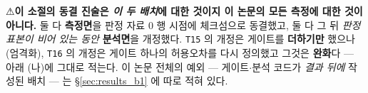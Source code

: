 \documentclass[11pt]{report}
\numberwithin{equation}{chapter}
\numberwithin{figure}{chapter}
\numberwithin{table}{chapter}
\begin{document}
⚠\textbf{이 소절의 동결 진술은 \emph{이 두 배치}에 대한 것이지 이 논문의 모든 측정에 대한
것이 아니다.} 둘 다 \textbf{측정면}을 판정 자료 $0$ 행 시점에 체크섬으로 동결했고, 둘 다
그 뒤 \emph{판정 표본이 비어 있는 동안} \textbf{분석면}을 개정했다. \texttt{T15} 의 개정은
게이트를 \textbf{더하기만} 했으나(엄격화), \texttt{T16} 의 개정은 게이트 하나의 허용오차를
다시 정의했고 그것은 \textbf{완화}다 --- 아래 (나)에 그대로 적는다.
이 논문 전체의 예외 --- 게이트$\cdot$분석 코드가 \emph{결과 뒤에} 작성된 배치 --- 는
\S\ref{sec:results_b1} 에 따로 적혀 있다.
\end{document}

